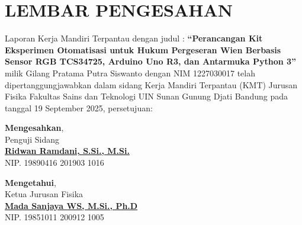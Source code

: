 \chapter*{\centering LEMBAR PENGESAHAN}

\thispagestyle{empty}

Laporan Kerja Mandiri Terpantau dengan judul : \textbf{“Perancangan Kit Eksperimen Otomatisasi untuk Hukum Pergeseran Wien Berbasis Sensor RGB TCS34725, Arduino Uno R3, dan Antarmuka Python 3”} milik Gilang Pratama Putra Siswanto dengan NIM 1227030017 telah dipertanggungjawabkan dalam sidang Kerja Mandiri Terpantau (KMT) Jurusan Fisika Fakultas Sains dan Teknologi UIN Sunan Gunung Djati Bandung pada tanggal 19 September 2025, persetujuan:


\vspace{1cm}

\begin{center}

\textbf{Mengesahkan}, \\
Penguji Sidang \\
\vspace{2.75cm}
\underline{ \textbf{Ridwan Ramdani, S.Si., M.Si.} } \\
NIP. 19890416 201903 1016 \\

\vspace{1cm}

\textbf{Mengetahui}, \\
Ketua Jurusan Fisika \\
\vspace{2.75cm}
\underline{ \textbf{Mada Sanjaya WS, M.Si., Ph.D} } \\
NIP. 19851011 200912 1005 \\
\end{center}
